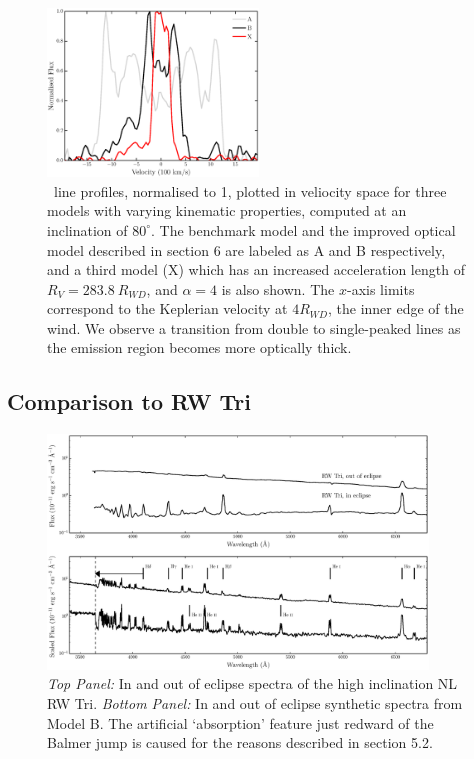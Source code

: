 \documentclass[preprint, a4paper, 11pt]{aastex}
\begin{document}
\begin{figure}
\includegraphics[width=0.5\textwidth]{figures/mc.eps}
\caption{
\ha\ line profiles, normalised to 1, plotted in veliocity space 
for three models with varying kinematic 
properties, computed at an inclination of $80^\circ$.
The benchmark model and the improved optical
model described in section 6 are labeled as A and B respectively,
and a third model (X) which has an increased acceleration length of 
$R_V = 283.8~R_{WD}$, and $\alpha=4$ is also shown. 
The $x$-axis limits correspond to the Keplerian velocity at 
$4R_{WD}$, the inner edge of the wind.
We observe a transition from double to single-peaked lines
as the emission region becomes more optically thick.
}
\label{halpha}
\end{figure} %


\subsection{Comparison to RW Tri}

\begin{figure} %
\includegraphics[width=0.9\textwidth]{figures/fig13_eclipse.eps}
\caption{{\sl Top Panel:} In and out of eclipse spectra of the high
inclination NL RW Tri. {\sl Bottom Panel:} In and out of eclipse synthetic
spectra from Model B.
The artificial `absorption' feature just redward of the Balmer jump
is caused for the reasons described in section 5.2.}
\label{rwtricomp}
\end{figure} %
\end{document}
